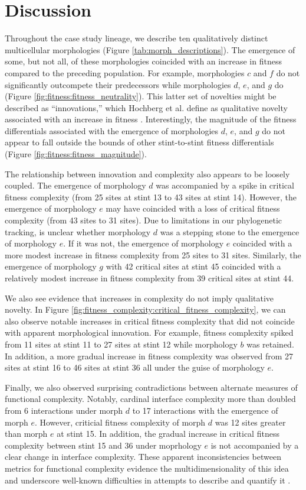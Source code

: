 \section{Discussion}

Throughout the case study lineage, we describe ten qualitatively distinct multicellular morphologies (Figure \ref{tab:morph_descriptions}).
The emergence of some, but not all, of these morphologies coincided with an increase in fitness compared to the preceding population.
For example, morphologies $c$ and $f$ do not significantly outcompete their predecessors while morphologies $d$, $e$, and $g$ do (Figure \ref{fig:fitness:fitness_neutrality}).
This latter set of novelties might be described as ``innovations,'' which Hochberg et al. define as qualitative novelty associated with an increase in fitness \citep{hochberg2017innovation}.
Interestingly, the magnitude of the fitness differentials associated with the emergence of morphologies $d$, $e$, and $g$ do not appear to fall outside the bounds of other stint-to-stint fitness differentials (Figure \ref{fig:fitness:fitness_magnitude}).

The relationship between innovation and complexity also appears to be loosely coupled.
The emergence of morphology $d$ was accompanied by a spike in critical fitness complexity (from 25 sites at stint 13 to 43 sites at stint 14).
However, the emergence of morphology $e$ may have coincided with a loss of critical fitness complexity (from 43 sites to 31 sites).
Due to limitations in our phylogenetic tracking, is unclear whether morphology $d$ was a stepping stone to the emergence of morphology $e$.
If it was not, the emergence of morphology $e$ coincided with a more modest increase in fitness complexity from 25 sites to 31 sites.
Similarly, the emergence of morphology $g$ with 42 critical sites at stint 45 coincided with a relatively modest increase in fitness complexity from 39 critical sites at stint 44.

We also see evidence that increases in complexity do not imply qualitative novelty.
In Figure \ref{fig:fitness_complexity:critical_fitness_complexity}, we can also observe notable increases in critical fitness complexity that did not coincide with apparent morphological innovation.
For example, fitness complexity spiked from 11 sites at stint 11 to 27 sites at stint 12 while morphology $b$ was retained.
In addition, a more gradual increase in fitness complexity was observed from 27 sites at stint 16 to 46 sites at stint 36 all under the guise of morphology $e$.

Finally, we also observed surprising contradictions between alternate measures of functional complexity.
Notably, cardinal interface complexity more than doubled from 6 interactions under morph $d$ to 17 interactions with the emergence of morph $e$.
However, criticial fitness complexity of morph $d$ was 12 sites greater than morph $e$ at stint 15.
In addition, the gradual increase in critical fitness complexity between stint 15 and 36 under moprhology $e$ is not accompanied by a clear change in interface complexity.
These apparent inconsistencies between metrics for functional complexity evidence the multidimensionality of this idea and underscore well-known difficulties in attempts to describe and quantify it \citep{bottcher2018molecules}. 